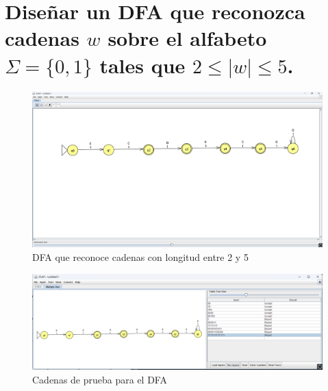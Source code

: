 \documentclass[11pt]{report}
\begin{document}
\section{Diseñar un DFA que reconozca cadenas $w$ sobre el alfabeto $\Sigma = \{0, 1\}$ tales que $2\leq |w| \leq 5$.}
\begin{figure}[H]
  \centering
  \includegraphics[scale=0.34]{img/DFA_05.png}
  \caption{DFA que reconoce cadenas con longitud entre 2 y 5}
\end{figure}

\begin{figure}[H]
  \centering
  \includegraphics[scale=0.45]{img/DFA_05_test.png}
  \caption{Cadenas de prueba para el DFA}
\end{figure}

\newpage
\end{document}
